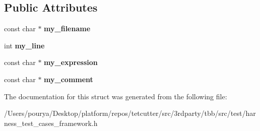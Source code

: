 \subsection*{Public Attributes}
\begin{DoxyCompactItemize}
\item 
\hypertarget{structtest__framework_1_1assertion__failure_a6f7c1b770bac92b984b41f62377aa5bf}{}const char $\ast$ {\bfseries my\+\_\+filename}\label{structtest__framework_1_1assertion__failure_a6f7c1b770bac92b984b41f62377aa5bf}

\item 
\hypertarget{structtest__framework_1_1assertion__failure_a70b05b996ce59e24343c248439623116}{}int {\bfseries my\+\_\+line}\label{structtest__framework_1_1assertion__failure_a70b05b996ce59e24343c248439623116}

\item 
\hypertarget{structtest__framework_1_1assertion__failure_afea9932281d7f917b98264ecbfa5518c}{}const char $\ast$ {\bfseries my\+\_\+expression}\label{structtest__framework_1_1assertion__failure_afea9932281d7f917b98264ecbfa5518c}

\item 
\hypertarget{structtest__framework_1_1assertion__failure_a48ac67bf3c3c7355dcfb748b7664b0c5}{}const char $\ast$ {\bfseries my\+\_\+comment}\label{structtest__framework_1_1assertion__failure_a48ac67bf3c3c7355dcfb748b7664b0c5}

\end{DoxyCompactItemize}


The documentation for this struct was generated from the following file\+:\begin{DoxyCompactItemize}
\item 
/\+Users/pourya/\+Desktop/platform/repos/tetcutter/src/3rdparty/tbb/src/test/harness\+\_\+test\+\_\+cases\+\_\+framework.\+h\end{DoxyCompactItemize}
